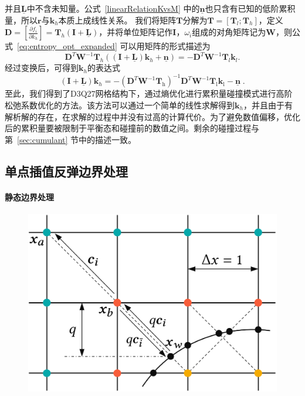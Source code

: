 并且$\bm{\underline{L}}$中不含未知量。公式~\ref{linearRelationKvsM} 中的$\bm{\underline{n}}$也只含有已知的低阶累积量，所以$\bm{r}$与$\bm{k}_h$本质上成线性关系。
我们将矩阵$\bm{T}$分解为$\bm{T} = [\bm{T}_l; \bm{T}_h]$，定义$\bm{D} = [\frac{\partial f_i}{\partial k_h}] = \bm{T}_h(\bm{I} + \bm{\underline{L}})$，并将单位矩阵记作$\bm{I}$，$\omega_i$组成的对角矩阵记为$\bm{W}$，则公式~\ref{eq:entropy_opt_expanded} 可以用矩阵的形式描述为
\begin{equation}
    \bm{D}^T \bm{W}^{-1} \bm{T}_h ((\bm{I} + \bm{\underline{L}}) \bm{k}_h + \bm{\underline{n}}) = -\bm{D}^T \bm{W}^{-1} \bm{T}_l \bm{k}_l .
\end{equation}
经过变换后，可得到$\bm{k}_h$的表达式
\begin{equation} \label{eq:solution}
	(\bm{I} + \bm{\underline{L}}) \bm{k}_h =  -(\bm{D}^T \bm{W}^{-1} \bm{T}_\text{h})^{-1}\bm{D}^T \bm{W}^{-1} \bm{T}_\text{l} \bm{k}_\text{l} - \bm{\underline{n}} \;.
\end{equation}
至此，我们得到了D3Q27网格结构下，通过熵优化进行累积量碰撞模式进行高阶松弛系数优化的方法。该方法可以通过一个简单的线性求解得到$\bm{k}_h$，并且由于有解析解的存在，在求解的过程中并没有过高的计算代价。为了避免数值偏移，优化后的累积量要被限制于平衡态和碰撞前的数值之间。剩余的碰撞过程与第~\ref{sec:cumulant} 节中的描述一致。

\subsection{单点插值反弹边界处理}
\paragraph{静态边界处理}
\begin{figure}[htb]
  \centering
    \includegraphics[width=0.6\columnwidth]{figures/boundary.png}
  \label{img:boundary}
\end{figure}

